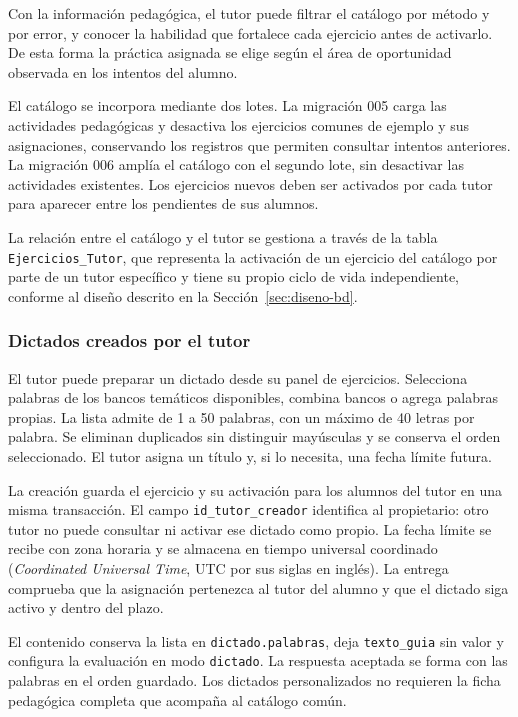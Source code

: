 Con la información pedagógica, el tutor puede filtrar el catálogo por método y
por error, y conocer la habilidad que fortalece cada ejercicio antes de
activarlo. De esta forma la práctica asignada se elige según el área de
oportunidad observada en los intentos del alumno.

El catálogo se incorpora mediante dos lotes. La migración 005 carga las
actividades pedagógicas y desactiva los ejercicios comunes de ejemplo y sus
asignaciones, conservando los registros que permiten consultar intentos
anteriores. La migración 006 amplía el catálogo con el segundo lote, sin
desactivar las actividades existentes. Los ejercicios nuevos deben ser
activados por cada tutor para aparecer entre los pendientes de sus alumnos.

La relación entre el catálogo y el tutor se gestiona a través de la tabla
\texttt{Ejercicios\_Tutor}, que representa la activación de un ejercicio del
catálogo por parte de un tutor específico y tiene su propio ciclo de vida
independiente, conforme al diseño descrito en la Sección~\ref{sec:diseno-bd}.

\subsubsection{Dictados creados por el tutor}

El tutor puede preparar un dictado desde su panel de ejercicios. Selecciona
palabras de los bancos temáticos disponibles, combina bancos o agrega palabras
propias. La lista admite de 1 a 50 palabras, con un máximo de 40 letras por
palabra. Se eliminan duplicados sin distinguir mayúsculas y se conserva el
orden seleccionado. El tutor asigna un título y, si lo necesita, una fecha
límite futura.

La creación guarda el ejercicio y su activación para los alumnos del tutor
en una misma transacción. El campo \texttt{id\_tutor\_creador} identifica al
propietario: otro tutor no puede consultar ni activar ese dictado como propio.
La fecha límite se recibe con zona horaria y se almacena en tiempo universal
coordinado (\textit{Coordinated Universal Time}, UTC por sus siglas en inglés). La entrega comprueba que la asignación pertenezca al tutor
del alumno y que el dictado siga activo y dentro del plazo.

El contenido conserva la lista en \texttt{dictado.palabras}, deja
\texttt{texto\_guia} sin valor y configura la evaluación en modo
\texttt{dictado}. La respuesta aceptada se forma con las palabras en el orden
guardado. Los dictados personalizados no requieren la ficha pedagógica
completa que acompaña al catálogo común.

